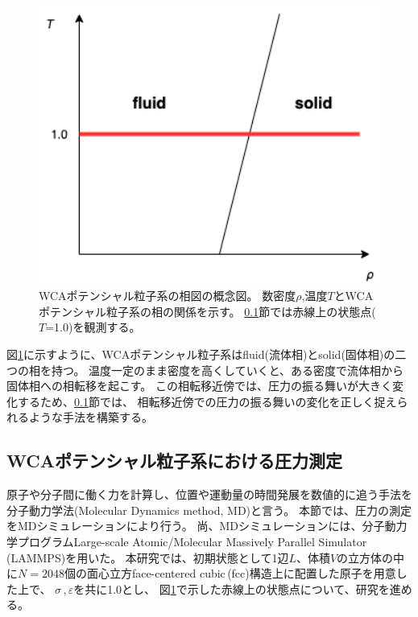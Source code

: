 \documentclass[titlepage]{jsreport}
\begin{document}
{{{\begin{figure}[htbp]
    \begin{center}
        \includegraphics[width=12cm]{fig/wca-phase-diagram.png}
    \end{center}
    \caption{WCAポテンシャル粒子系の相図の概念図。
    数密度$\rho$,温度$T$とWCAポテンシャル粒子系の相の関係を示す。
    \ref{method-subsec:WCA-pressure}節では赤線上の状態点($T$=1.0)を観測する。}
    
    \label{fig:wca-phase-diagram}
\end{figure}

\newpage
図\ref{fig:wca-phase-diagram}に示すように、WCAポテンシャル粒子系はfluid(流体相)とsolid(固体相)の二つの相を持つ。
温度一定のまま密度を高くしていくと、ある密度で流体相から固体相への相転移を起こす。
この相転移近傍では、圧力の振る舞いが大きく変化するため、\ref{method-subsec:WCA-pressure}節では、
相転移近傍での圧力の振る舞いの変化を正しく捉えられるような手法を構築する。


\subsection{WCAポテンシャル粒子系における圧力測定}\label{method-subsec:WCA-pressure}
原子や分子間に働く力を計算し、位置や運動量の時間発展を数値的に追う手法を分子動力学法(Molecular Dynamics method, MD)と言う\cite{molecular-dynamics}。
本節では、圧力の測定をMDシミュレーションにより行う。
尚、MDシミュレーションには、分子動力学プログラムLarge-scale Atomic/Molecular Massively Parallel Simulator\,(LAMMPS)\cite{lammps}を用いた。
本研究では、初期状態として1辺$L$、体積$V$の立方体の中に$N=2048$個の面心立方face-centered cubic\,(fcc)構造上に配置した原子を用意した上で、
${\sigma}$\,,\,${\varepsilon}$を共に1.0とし、
図\ref{fig:wca-phase-diagram}で示した赤線上の状態点について、研究を進める。

}}}
\end{document}

